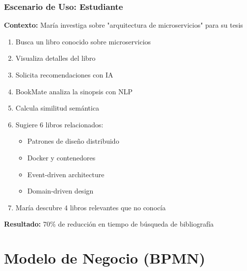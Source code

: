 \documentclass[aspectratio=169]{beamer}
\begin{document}
\begin{frame}
\frametitle{Escenario de Uso: Estudiante}

\textbf{Contexto:} María investiga sobre "arquitectura de microservicios" para su tesis

\vspace{0.3cm}

\begin{enumerate}
\item Busca un libro conocido sobre microservicios
\item Visualiza detalles del libro
\item Solicita recomendaciones con IA
\item BookMate analiza la sinopsis con NLP
\item Calcula similitud semántica
\item Sugiere 6 libros relacionados:
  \begin{itemize}
  \item Patrones de diseño distribuido
  \item Docker y contenedores
  \item Event-driven architecture
  \item Domain-driven design
  \end{itemize}
\item María descubre 4 libros relevantes que no conocía
\end{enumerate}

\vspace{0.3cm}

\begin{tcolorbox}[colback=green!5, colframe=green!50]
\textbf{Resultado:} 70\% de reducción en tiempo de búsqueda de bibliografía
\end{tcolorbox}

\end{frame}

\section{Modelo de Negocio (BPMN)}
\end{document}

